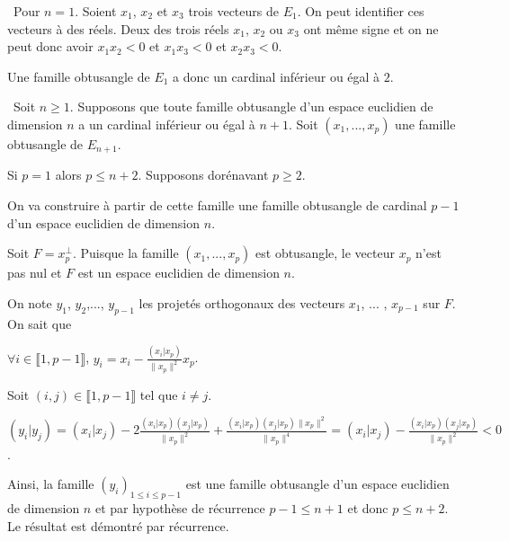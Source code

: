 {{\textbullet~Pour $n = 1$. Soient $x_1$, $x_2$ et $x_3$ trois vecteurs de $E_1$. On peut identifier ces vecteurs à des réels. Deux des trois réels $x_1$, $x_2$ ou $x_3$ ont même signe et on ne peut donc avoir $x_1x_2 < 0$ et $x_1x_3 < 0$ et $x_2x_3 < 0$.

Une famille obtusangle de $E_1$ a donc un cardinal inférieur ou égal à $2$.

\textbullet~Soit $n\geqslant1$. Supposons que toute famille obtusangle d'un espace euclidien de dimension $n$ a un cardinal inférieur ou égal à $n+1$. Soit $(x_1,...,x_p)$ une famille obtusangle de $E_{n+1}$.

Si $p = 1$ alors $p\leqslant n+2$. Supposons dorénavant $p\geqslant2$.

On va construire à partir de cette famille une famille obtusangle de cardinal $p-1$ d'un espace euclidien de dimension $n$.

Soit $F=x_p^\bot$. Puisque la famille $(x_1,...,x_p)$ est obtusangle, le vecteur $x_p$ n'est pas nul et $F$ est un espace euclidien de dimension $n$.

On note $y_1$, $y_2$,..., $y_{p-1}$ les projetés orthogonaux des vecteurs $x_1$, ... , $x_{p-1}$ sur $F$. On sait que

\begin{center}
$\forall i\in\llbracket1,p-1\rrbracket$, $y_i =x_i -\frac{\left(x_i|x_p\right)}{\|x_p\|^2}x_p$.
\end{center}

Soit $(i,j)\in\llbracket1,p-1\rrbracket$ tel que $i\neq j$.

\begin{center}
$\left(y_i|y_j\right)=\left(x_i|x_j\right)-2\frac{\left(x_i|x_p\right)\left(x_j|x_p\right)}{\|x_p\|^2}+\frac{\left(x_i|x_p\right)\left(x_j|x_p\right)\|x_p\|^2}{\|x_p\|^4}= \left(x_i|x_j\right)-\frac{\left(x_i|x_p\right)\left(x_j|x_p\right)}{\|x_p\|^2}< 0$.
\end{center}

Ainsi, la famille $(y_i)_{1\leqslant i\leqslant p-1}$ est une famille obtusangle d'un espace euclidien de dimension $n$ et par hypothèse de récurrence $p-1\leqslant n+1$ et donc $p\leqslant n+2$. Le résultat est démontré par récurrence.
}
}
